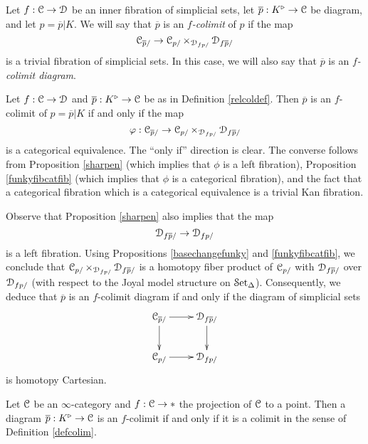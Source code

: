 \begin{definition}\label{relcoldef}
Let $f: \operatorname{\mathcal{C}} \rightarrow \operatorname{\mathcal{D}}$ be an inner fibration of simplicial sets, let
$\overline{p}: K^{\triangleright} \rightarrow \operatorname{\mathcal{C}}$ be diagram, and let $p = \overline{p}|K$.
We will say that $\overline{p}$ is an {\it $f$-colimit} of $p$ if the map
$$ \operatorname{\mathcal{C}}_{\overline{p}/} \rightarrow \operatorname{\mathcal{C}}_{p/} \times_{ \operatorname{\mathcal{D}}_{f p/} } \operatorname{\mathcal{D}}_{ f\overline{p}/} $$
is a trivial fibration of simplicial sets. In this case, we will also say that
$\overline{p}$ is an {\it $f$-colimit diagram}.
\end{definition}

\begin{remark}\label{suppwolf}
Let $f: \operatorname{\mathcal{C}} \rightarrow \operatorname{\mathcal{D}}$ and $\overline{p}: K^{\triangleright} \rightarrow \operatorname{\mathcal{C}}$ be
as in Definition \ref{relcoldef}. Then $\overline{p}$ is an $f$-colimit of $p = \overline{p}|K$ if and only if the map 
$$ \varphi: \operatorname{\mathcal{C}}_{\overline{p}/} \rightarrow \operatorname{\mathcal{C}}_{p/} \times_{ \operatorname{\mathcal{D}}_{f p/} } \operatorname{\mathcal{D}}_{ f \overline{p}/} $$
is a categorical equivalence. The ``only if'' direction is clear. The converse follows from
Proposition \ref{sharpen} (which implies that $\phi$ is a left fibration), Proposition \ref{funkyfibcatfib} (which implies that $\phi$ is a categorical fibration), and the fact that a categorical fibration which is a categorical equivalence is a trivial Kan fibration.

Observe that Proposition \ref{sharpen} also implies that the map
$$ \operatorname{\mathcal{D}}_{f  \overline{p}/} \rightarrow \operatorname{\mathcal{D}}_{f p/}$$
is a left fibration. Using Propositions \ref{basechangefunky} and \ref{funkyfibcatfib}, we conclude that $ \operatorname{\mathcal{C}}_{p/} \times_{ \operatorname{\mathcal{D}}_{f p/} } \operatorname{\mathcal{D}}_{f \overline{p}/}$ is a homotopy fiber product of
$\operatorname{\mathcal{C}}_{p/}$ with $\operatorname{\mathcal{D}}_{f \overline{p}/}$ over $\operatorname{\mathcal{D}}_{f p/}$ (with respect to the Joyal model structure on $\operatorname{\mathcal{S}et_{\Delta}}$). 
Consequently, we deduce that $\overline{p}$ is an $f$-colimit diagram if and only if the
diagram of simplicial sets
$$ \xymatrix{ \calC_{ \overline{p}/} \ar[r] \ar[d] & \calD_{ f \overline{p} / } \ar[d] \\
\calC_{ p/ } \ar[r] & \calD_{f p/ } }$$
is homotopy Cartesian.
\end{remark}

\begin{example}
Let $\operatorname{\mathcal{C}}$ be an $\infty$-category and $f: \operatorname{\mathcal{C}} \rightarrow \ast$ the projection of $\operatorname{\mathcal{C}}$ to a point. Then a diagram $\overline{p}: K^{\triangleright} \rightarrow \operatorname{\mathcal{C}}$ is an $f$-colimit if and only if it is a colimit in the sense of Definition \ref{defcolim}.
\end{example}

